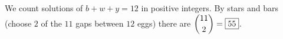 We count solutions of $b+w+y=12$ in positive integers. By stars and bars (choose $2$ of the $11$ gaps between $12$ eggs) there are $\dbinom{11}{2}=\boxed{55}$.
